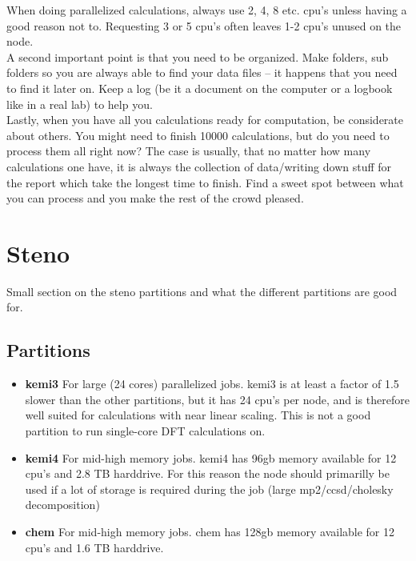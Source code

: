 \documentclass{article}
\begin{document}
When doing parallelized calculations, always use 2, 4, 8 etc. cpu's unless having a good reason not to.
Requesting 3 or 5 cpu's often leaves 1-2 cpu's unused on the node.\\

A second important point is that you need to be organized.
Make folders, sub folders so you are always able to find your data files – it happens that you need to find it later on.
Keep a log (be it a document on the computer or a logbook like in a real lab) to help you.\\

Lastly, when you have all you calculations ready for computation, be considerate about others.
You might need to finish 10000 calculations, but do you need to process them all right now?
The case is usually, that no matter how many calculations one have, it is always the collection of data/writing down stuff for the report which take the longest time to finish.
Find a sweet spot between what you can process and you make the rest of the crowd pleased.\\


\newpage
\section{Steno}

Small section on the steno partitions  and what the different partitions are good for.

\subsection*{Partitions}

\begin{itemize}

    \item {\bf kemi3} 
        For large (24 cores) parallelized jobs.
        kemi3 is at least a factor of 1.5 slower than the other partitions, but it has 24 cpu's per node, and is therefore well suited for calculations with near linear scaling.
        This is not a good partition to run single-core DFT calculations on.

    \item {\bf kemi4} 
        For mid-high memory jobs.
        kemi4 has 96gb memory available for 12 cpu's and 2.8 TB harddrive.
        For this reason the node should primarilly be used if a lot of storage is required
        during the job (large mp2/ccsd/cholesky decomposition)

    \item {\bf chem} 
        For mid-high memory jobs.
        chem has 128gb memory available for 12 cpu's and 1.6 TB harddrive.

\end{itemize}
\end{document}
